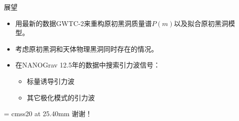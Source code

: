 \documentclass[xcolor={svgnames},compress]{beamer}
\let\olditem\item
\renewcommand{\item}{%
    \olditem\vspace{\fill}}
\begin{document}
\begin{frame}{展望}
    \begin{itemize}
        \item 用\lvc 最新的数据GWTC-2来重构原初黑洞质量谱$P(m)$以及拟合原初黑洞模型。
        
        \item 考虑原初黑洞和天体物理黑洞同时存在的情况。
        
        \item 在NANOGrav 12.5年的数据中搜索引力波信号：
        \begin{itemize}
            \item 标量诱导引力波
            \item 其它极化模式的引力波
        \end{itemize}
    \end{itemize}  
\end{frame}

\begin{frame}[plain]
    \begin{center}
        \font\endfont = cmss20 at 25.40mm
        \color{Blue}
        \endfont
        \baselineskip 20.0mm
        \fontsize{50.0pt}{\baselineskip}\selectfont  谢谢！
    \end{center} 
\end{frame}
\end{document}
